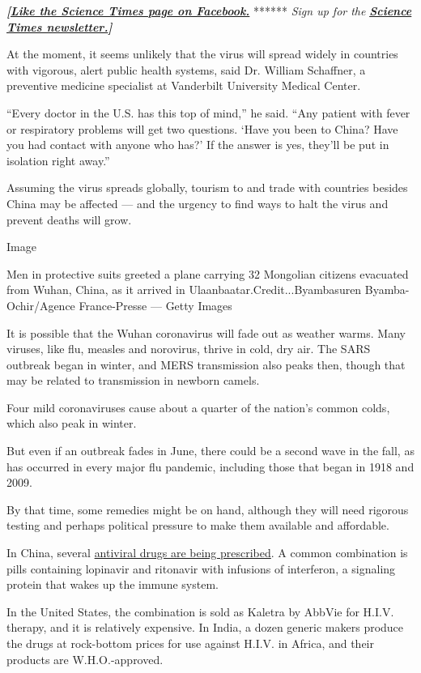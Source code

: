 \textbf{\emph{{[}}\href{http://on.fb.me/1paTQ1h}{\emph{Like the Science
Times page on Facebook.}}} ****** \emph{\textbar{} Sign up for the}
\textbf{\href{http://nyti.ms/1MbHaRU}{\emph{Science Times
newsletter.}}\emph{{]}}}

At the moment, it seems unlikely that the virus will spread widely in
countries with vigorous, alert public health systems, said Dr. William
Schaffner, a preventive medicine specialist at Vanderbilt University
Medical Center.

``Every doctor in the U.S. has this top of mind,'' he said. ``Any
patient with fever or respiratory problems will get two questions. `Have
you been to China? Have you had contact with anyone who has?' If the
answer is yes, they'll be put in isolation right away.''

Assuming the virus spreads globally, tourism to and trade with countries
besides China may be affected --- and the urgency to find ways to halt
the virus and prevent deaths will grow.

Image

Men in protective suits greeted a plane carrying 32 Mongolian citizens
evacuated from Wuhan, China, as it arrived in
Ulaanbaatar.Credit...Byambasuren Byamba-Ochir/Agence France-Presse ---
Getty Images

It is possible that the Wuhan coronavirus will fade out as weather
warms. Many viruses, like flu, measles and norovirus, thrive in cold,
dry air. The SARS outbreak began in winter, and MERS transmission also
peaks then, though that may be related to transmission in newborn
camels.

Four mild coronaviruses cause about a quarter of the nation's common
colds, which also peak in winter.

But even if an outbreak fades in June, there could be a second wave in
the fall, as has occurred in every major flu pandemic, including those
that began in 1918 and 2009.

By that time, some remedies might be on hand, although they will need
rigorous testing and perhaps political pressure to make them available
and affordable.

In China, several
\href{https://www.sciencemag.org/news/2020/01/can-anti-hiv-combination-or-other-existing-drugs-outwit-new-coronavirus}{antiviral
drugs are being prescribed}. A common combination is pills containing
lopinavir and ritonavir with infusions of interferon, a signaling
protein that wakes up the immune system.

In the United States, the combination is sold as Kaletra by AbbVie for
H.I.V. therapy, and it is relatively expensive. In India, a dozen
generic makers produce the drugs at rock-bottom prices for use against
H.I.V. in Africa, and their products are W.H.O.-approved.


